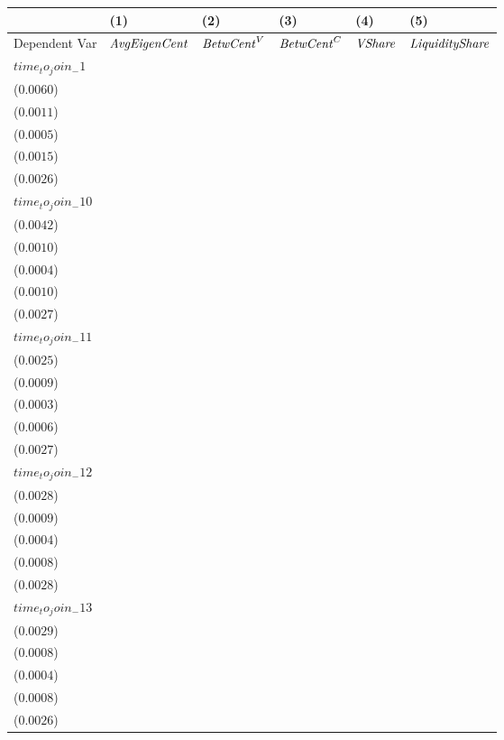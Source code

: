 \begin{tabular}{llllll}
\toprule
{} &                                    (1) &                                    (2) &                                    (3) &                                    (4) &                                    (5) \\
\midrule
Dependent Var      &                   ${\it AvgEigenCent}$ &                     ${\it BetwCent}^V$ &                     ${\it BetwCent}^C$ &                         ${\it VShare}$ &                 ${\it LiquidityShare}$ \\
$time_to_join_-1$  &  \makecell{$-0.0014^{}$ \\ ($0.0060$)} &  \makecell{$-0.0006^{}$ \\ ($0.0011$)} &  \makecell{$-0.0003^{}$ \\ ($0.0005$)} &   \makecell{$0.0000^{}$ \\ ($0.0015$)} &   \makecell{$0.0022^{}$ \\ ($0.0026$)} \\
$time_to_join_-10$ &   \makecell{$0.0031^{}$ \\ ($0.0042$)} &  \makecell{$-0.0005^{}$ \\ ($0.0010$)} &  \makecell{$-0.0001^{}$ \\ ($0.0004$)} &   \makecell{$0.0011^{}$ \\ ($0.0010$)} &   \makecell{$0.0022^{}$ \\ ($0.0027$)} \\
$time_to_join_-11$ &  \makecell{$-0.0015^{}$ \\ ($0.0025$)} &  \makecell{$-0.0006^{}$ \\ ($0.0009$)} &  \makecell{$-0.0001^{}$ \\ ($0.0003$)} &  \makecell{$-0.0002^{}$ \\ ($0.0006$)} &   \makecell{$0.0022^{}$ \\ ($0.0027$)} \\
$time_to_join_-12$ &  \makecell{$-0.0002^{}$ \\ ($0.0028$)} &  \makecell{$-0.0006^{}$ \\ ($0.0009$)} &  \makecell{$-0.0002^{}$ \\ ($0.0004$)} &   \makecell{$0.0002^{}$ \\ ($0.0008$)} &   \makecell{$0.0022^{}$ \\ ($0.0028$)} \\
$time_to_join_-13$ &  \makecell{$-0.0014^{}$ \\ ($0.0029$)} &  \makecell{$-0.0005^{}$ \\ ($0.0008$)} &  \makecell{$-0.0001^{}$ \\ ($0.0004$)} &  \makecell{$-0.0001^{}$ \\ ($0.0008$)} &   \makecell{$0.0026^{}$ \\ ($0.0026$)} \\

\end{tabular}
